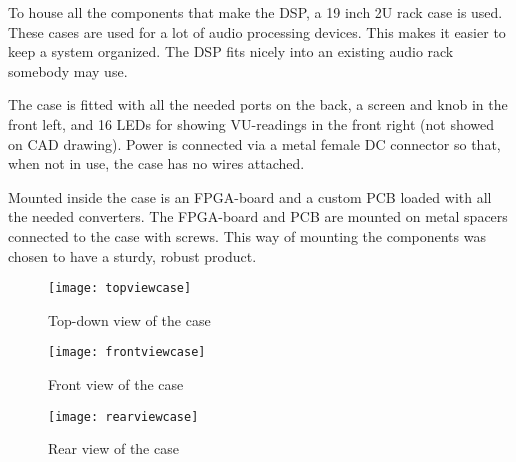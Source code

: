 To house all the components that make the DSP, a 19 inch 2U rack case is used. These cases are used for a lot of audio processing devices. This makes it easier to keep a system organized. The DSP fits nicely into an existing audio rack somebody may use.
\par 
\noindent The case is fitted with all the needed ports on the back, a screen and knob in the front left, and 16 LEDs for showing VU-readings in the front right (not showed on CAD drawing). Power is connected via a metal female DC connector so that, when not in use, the case has no wires attached. 
\par
\noindent Mounted inside the case is an FPGA-board and a custom PCB loaded with all the needed converters. The FPGA-board and PCB are mounted on metal spacers connected to the case with screws. This way of mounting the components was chosen to have a sturdy, robust product.

\begin{figure}[ht]
    \texttt{[image: topviewcase]}
    \caption{Top-down view of the case}
    \label{fig:topview}
\end{figure}

\begin{figure}[ht]
    \texttt{[image: frontviewcase]}
    \caption{Front view of the case}
    \label{fig:frontview}
\end{figure}

\begin{figure}[ht]
    \texttt{[image: rearviewcase]}
    \caption{Rear view of the case}
    \label{fig:rearview}
\end{figure}

\newpage 